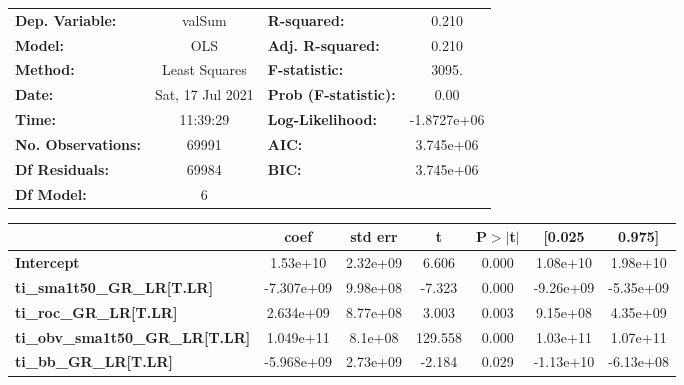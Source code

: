 \begin{center}
\begin{tabular}{lclc}
\toprule
\textbf{Dep. Variable:}                 &      valSum      & \textbf{  R-squared:         } &      0.210   \\
\textbf{Model:}                         &       OLS        & \textbf{  Adj. R-squared:    } &      0.210   \\
\textbf{Method:}                        &  Least Squares   & \textbf{  F-statistic:       } &      3095.   \\
\textbf{Date:}                          & Sat, 17 Jul 2021 & \textbf{  Prob (F-statistic):} &      0.00    \\
\textbf{Time:}                          &     11:39:29     & \textbf{  Log-Likelihood:    } & -1.8727e+06  \\
\textbf{No. Observations:}              &       69991      & \textbf{  AIC:               } &  3.745e+06   \\
\textbf{Df Residuals:}                  &       69984      & \textbf{  BIC:               } &  3.745e+06   \\
\textbf{Df Model:}                      &           6      & \textbf{                     } &              \\
\bottomrule
\end{tabular}
\begin{tabular}{lcccccc}
                                        & \textbf{coef} & \textbf{std err} & \textbf{t} & \textbf{P$> |$t$|$} & \textbf{[0.025} & \textbf{0.975]}  \\
\midrule
\textbf{Intercept}                      &     1.53e+10  &     2.32e+09     &     6.606  &         0.000        &     1.08e+10    &     1.98e+10     \\
\textbf{ti\_sma1t50\_GR\_LR[T.LR]}      &   -7.307e+09  &     9.98e+08     &    -7.323  &         0.000        &    -9.26e+09    &    -5.35e+09     \\
\textbf{ti\_roc\_GR\_LR[T.LR]}          &    2.634e+09  &     8.77e+08     &     3.003  &         0.003        &     9.15e+08    &     4.35e+09     \\
\textbf{ti\_obv\_sma1t50\_GR\_LR[T.LR]} &    1.049e+11  &      8.1e+08     &   129.558  &         0.000        &     1.03e+11    &     1.07e+11     \\
\textbf{ti\_bb\_GR\_LR[T.LR]}           &   -5.968e+09  &     2.73e+09     &    -2.184  &         0.029        &    -1.13e+10    &    -6.13e+08     \\

\end{tabular}
\end{center}
